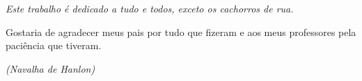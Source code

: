 \documentclass[
	12pt,			%
	openany,		%
	oneside,		%
	a4paper,		%
	english,		%
	brazil			%
	]{abntex2}
\begin{document}

\frenchspacing  %


\imprimircapa

\imprimirfolhaderosto*  %

%
%     
\imprimirfichacatalografica


% 

\begin{dedicatoria}
   \vspace*{\fill} \centering \noindent 
   \textit{ Este trabalho é dedicado a tudo e todos, exceto os cachorros de rua.} 
   \vspace*{\fill}
\end{dedicatoria}

\begin{agradecimentos}
  Gostaria de agradecer meus pais por tudo que fizeram e
  aos meus professores pela paciência que tiveram.
\end{agradecimentos}


\begin{epigrafe}
   \vspace*{\fill}
   \begin{flushright}
	\textit{
	(Navalha de Hanlon) }
   \end{flushright}
\end{epigrafe}
\end{document}
